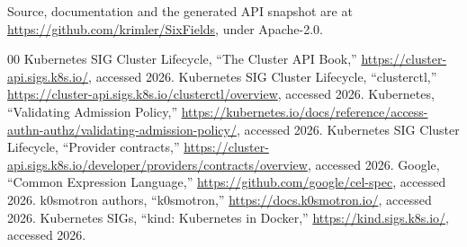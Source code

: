 \documentclass[conference]{IEEEtran}
\begin{document}
Source, documentation and the generated API snapshot are at
\url{https://github.com/krimler/SixFields}, under Apache-2.0.

\begin{thebibliography}{00}
 Kubernetes SIG Cluster Lifecycle, ``The Cluster API Book,''
\url{https://cluster-api.sigs.k8s.io/}, accessed 2026.
 Kubernetes SIG Cluster Lifecycle, ``clusterctl,''
\url{https://cluster-api.sigs.k8s.io/clusterctl/overview}, accessed 2026.
 Kubernetes, ``Validating Admission Policy,''
\url{https://kubernetes.io/docs/reference/access-authn-authz/validating-admission-policy/},
accessed 2026.
 Kubernetes SIG Cluster Lifecycle, ``Provider contracts,''
\url{https://cluster-api.sigs.k8s.io/developer/providers/contracts/overview},
accessed 2026.
 Google, ``Common Expression Language,''
\url{https://github.com/google/cel-spec}, accessed 2026.
 k0smotron authors, ``k0smotron,''
\url{https://docs.k0smotron.io/}, accessed 2026.
 Kubernetes SIGs, ``kind: Kubernetes in Docker,''
\url{https://kind.sigs.k8s.io/}, accessed 2026.
\end{thebibliography}
\end{document}
